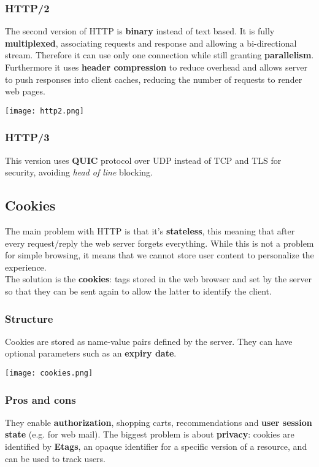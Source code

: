 \subsubsection{HTTP/2}
The second version of HTTP is \textbf{binary} instead of text based. It is fully \textbf{multiplexed}, associating requests and response and allowing a bi-directional stream. Therefore it can use only one connection while still granting \textbf{parallelism}. Furthermore it uses \textbf{header compression} to reduce overhead and allows server to push responses into client caches, reducing the number of requests to render web pages.
\begin{center}
	\texttt{[image: http2.png]}
\end{center}
\subsubsection{HTTP/3}
This version uses \textbf{QUIC} protocol over UDP instead of TCP and TLS for security, avoiding \textit{head of line} blocking.

\subsection{Cookies}
The main problem with HTTP is that it's \textbf{stateless}, this meaning that after every request/reply the web server forgets everything. While this is not a problem for simple browsing, it means that we cannot store user content to personalize the experience.\\
The solution is the \textbf{cookies}: tags stored in the web browser and set by the server so that they can be sent again to allow the latter to identify the client.\\
\subsubsection{Structure}
Cookies are stored as name-value pairs defined by the server. They can have optional parameters such as an \textbf{expiry date}.
\begin{center}
	\texttt{[image: cookies.png]}
\end{center}

\subsubsection{Pros and cons}
They enable \textbf{authorization}, shopping carts, recommendations and \textbf{user session state} (e.g. for web mail). The biggest problem is about \textbf{privacy}: cookies are identified by \textbf{Etags}, an opaque identifier for a specific version of a resource, and can be used to track users.

